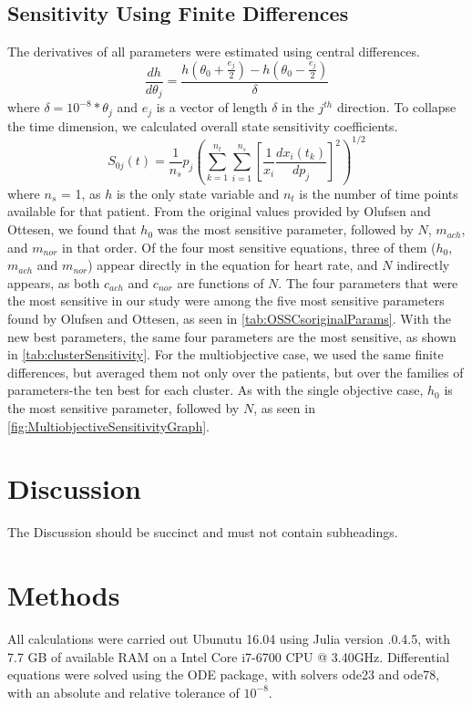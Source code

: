 \documentclass[fleqn,10pt]{wlscirep}
\begin{document}
\subsection*{Sensitivity Using Finite Differences}
The derivatives of all parameters were estimated using central differences. 
\begin{equation}
\frac{dh}{d\theta_j} = \frac{h(\theta_0+\frac{e_j}{2})-h(\theta_0-\frac{e_j}{2})}{\delta}
\end{equation}
where $\delta=10^{-8}*\theta_j$ and $e_j$ is a vector of length $\delta$ in the $j^{th}$ direction.
To collapse the time dimension, we calculated overall state sensitivity coefficients. \cite{stelling2004robustness}
\begin{equation}
S_{0j}(t) = \frac{1}{n_s}p_j \left(\sum_{k=1}^{n_t} \sum_{i=1}^{n_s} \left[ \frac{1}{x_i} \frac{dx_i(t_k)}{dp_j} \right]^2 \right)^{1/2}
\end{equation}
where $n_s$ = 1, as $h$ is the only state variable and $n_t$ is the number of time points available for that patient.
From the original values provided by Olufsen and Ottesen, we found that $h_0$ was the most sensitive parameter, followed by $N$, $m_{ach}$, and $m_{nor}$ in that order. Of the four most sensitive equations, three of them ($h_0$, $m_{ach}$ and $m_{nor}$) appear directly in the equation for heart rate, and $N$ indirectly appears, as both $c_{ach}$ and $c_{nor}$ are functions of $N$.
The four parameters that were the most sensitive in our study were among the five most sensitive parameters found by Olufsen and Ottesen, as seen in \ref{tab:OSSCsoriginalParams}.
With the new best parameters, the same four parameters are the most sensitive, as shown in \ref{tab:clusterSensitivity}. 
For the multiobjective case, we used the same finite differences, but averaged them not only over the patients, but over the families of parameters-the ten best for each cluster. As with the single objective case, $h_0$ is the most sensitive parameter, followed by $N$, as seen in \ref{fig:MultiobjectiveSensitivityGraph}.
\section*{Discussion}
The Discussion should be succinct and must not contain subheadings.
\section*{Methods}
All calculations were carried out Ubunutu 16.04 using Julia version .0.4.5, with 7.7 GB of available RAM on a Intel Core i7-6700 CPU @ 3.40GHz. Differential equations were solved using the ODE package, with solvers ode23 and ode78, with an absolute and relative tolerance of $10^{-8}$. 

\end{document}
